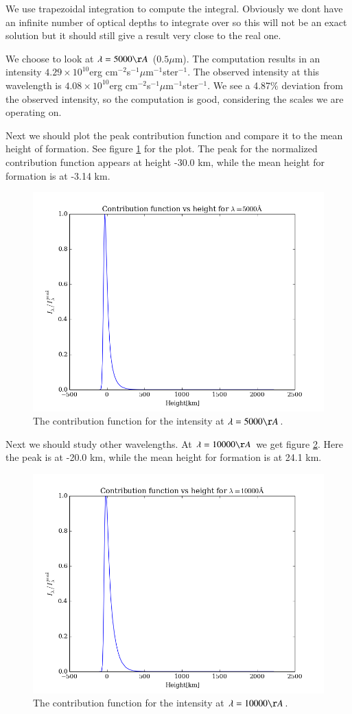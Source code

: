 \documentclass{aa}   %
\begin{document}
We use trapezoidal integration to compute the integral. Obviously we dont have an infinite number of optical depths to integrate over so this will not be an exact solution but it should still give a result very close to the real one.

We choose to look at $\lambda  = 5000 \AA$ ($0.5\mu$m). The computation results in an intensity $4.29\times10^{10}$erg cm$^{-2}$s$^{-1}\mu$m$^{-1}$ster$^{-1}$. The observed intensity at this wavelength is $4.08\times10^{10}$erg cm$^{-2}$s$^{-1}\mu$m$^{-1}$ster$^{-1}$. We see a 4.87$\%$ deviation from the observed intensity, so the computation is good, considering the scales we are operating on.

Next we should plot the peak contribution function and compare it to the mean height of formation.
See figure \ref{contfunc_5000} for the plot. The peak for the normalized contribution function appears at height -30.0 km, while the mean height for formation is at -3.14 km.

\begin{figure}
 \includegraphics[width=.49\textwidth]{contfunc_5000.png}
 \caption{The contribution function for the intensity at $\lambda= 5000\AA$.}
 \label{contfunc_5000}
\end{figure}

Next we should study other wavelengths. At $\lambda = 10000\AA$ we get figure \ref{contfunc_10000}. Here the peak is at -20.0 km, while the mean height for formation is at 24.1 km.

\begin{figure}
 \includegraphics[width=.49\textwidth]{contfunc_10000.png}
 \caption{The contribution function for the intensity at $\lambda= 10000\AA$.}
 \label{contfunc_10000}
\end{figure}
\end{document}
